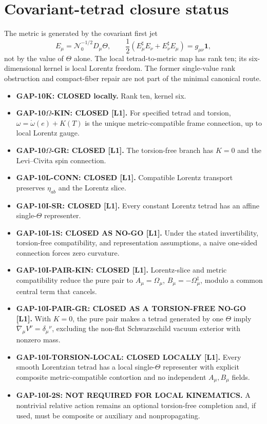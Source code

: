 \documentclass[12pt]{article}
\begin{document}
\section{Covariant-tetrad closure status}
\fi

The metric is generated by the covariant first jet
\[
 E_\mu=\mathcal N_0^{-1/2}D_\mu\Theta,
 \qquad
 \frac12(E_\mu^\sharp E_\nu+E_\nu^\sharp E_\mu)
 =g_{\mu\nu}\mathbf1,
\]
not by the value of $\Theta$ alone.  The local tetrad-to-metric map has rank
ten; its six-dimensional kernel is local Lorentz freedom.  The former
single-value rank obstruction and compact-fiber repair are not part of the
minimal canonical route.

\begin{tcolorbox}[colback=green!5!white,colframe=green!60!black,
 title=Closed kinematic subgaps]
\begin{itemize}
 \item \textbf{GAP-10K: CLOSED locally.} Rank ten, kernel six.
 \item \textbf{GAP-10$\Omega$-KIN: CLOSED [L1].} For specified tetrad and
       torsion,
       $\omega=\mathring\omega(e)+K(T)$ is the unique metric-compatible frame
       connection, up to local Lorentz gauge.
 \item \textbf{GAP-10$\Omega$-GR: CLOSED [L1].} The torsion-free branch has
       $K=0$ and the Levi--Civita spin connection.
 \item \textbf{GAP-10L-CONN: CLOSED [L1].} Compatible Lorentz transport
       preserves $\eta_{ab}$ and the Lorentz slice.
 \item \textbf{GAP-10I-SR: CLOSED [L1].} Every constant Lorentz tetrad has an
       affine single-$\Theta$ representer.
 \item \textbf{GAP-10I-1S: CLOSED AS NO-GO [L1].} Under the stated
       invertibility, torsion-free compatibility, and representation
       assumptions, a naive one-sided connection forces zero curvature.
 \item \textbf{GAP-10I-PAIR-KIN: CLOSED [L1].} Lorentz-slice and
       metric compatibility reduce the pure pair to
       $A_\mu=\Omega_\mu$, $B_\mu=-\Omega_\mu^\ddagger$, modulo a common
       central term that cancels.
 \item \textbf{GAP-10I-PAIR-GR: CLOSED AS A TORSION-FREE NO-GO [L1].}
       With $K=0$, the pure pair makes a tetrad generated by one $\Theta$
       imply $\mathring\nabla_\mu V^\nu=\delta_\mu{}^\nu$, excluding the
       non-flat Schwarzschild vacuum exterior with nonzero mass.
 \item \textbf{GAP-10I-TORSION-LOCAL: CLOSED LOCALLY [L1].} Every smooth
       Lorentzian tetrad has a local single-$\Theta$ representer with explicit
       composite metric-compatible contortion and no independent $A_\mu,B_\mu$
       fields.
 \item \textbf{GAP-10I-2S: NOT REQUIRED FOR LOCAL KINEMATICS.} A nontrivial
       relative action remains an optional torsion-free completion and, if
       used, must be composite or auxiliary and nonpropagating.
\end{itemize}
\end{tcolorbox}
\end{document}
